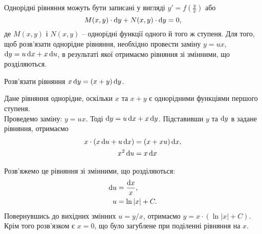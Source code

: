 Однорідні рівняння можуть бути записані у вигляді $y' = f \left( \frac{y}{x} \right)$ або 
\begin{equation*}
 	M(x, y)\cdot\mathop{}\!\mathrm{d} y + N(x, y) \cdot \mathop{}\!\mathrm{d} y = 0,
\end{equation*} де $M(x, y)$ і $N(x, y)$ -- однорідні функції одного й того ж ступеня. Для того, щоб розв’язати однорідне рівняння, необхідно провести заміну $y = u x$, $\mathop{}\!\mathrm{d} y = u \mathop{}\!\mathrm{d} x + x \mathop{}\!\mathrm{d} u$, в результаті якої отримаємо рівняння зі змінними, що розділяються. 

\begin{example}
	Розв’язати рівняння $x \mathop{}\!\mathrm{d} y = (x + y) \mathop{}\!\mathrm{d} y$. 
\end{example}

\begin{solution}
	Дане рівняння однорідне, оскільки $x$ та $x + y$ є однорідними функціями першого ступеня. \\

	Проведемо заміну: $y = u x$. Тоді $\mathop{}\!\mathrm{d} y = u \mathop{}\!\mathrm{d} x + x \mathop{}\!\mathrm{d} y$. Підставивши $y$ та $\mathop{}\!\mathrm{d} y$ в задане рівняння, отримаємо  
	\begin{align}
		\label{eq:1.2.22}
		x \cdot (x \mathop{}\!\mathrm{d} u + u \mathop{}\!\mathrm{d} x) &= (x + x u) \mathop{}\!\mathrm{d} x, \\
		x^2 \mathop{}\!\mathrm{d} u &= x \mathop{}\!\mathrm{d} x
	\end{align}

	Розв’яжемо це рівняння зі змінними, що розділяються:
	\begin{align}
		\label{eq:1.2.23}
		\mathop{}\!\mathrm{d} u &= \frac{\mathop{}\!\mathrm{d} x}{x}, \\
		u &= \ln |x| + C.
	\end{align}
	Повернувшись до вихідних змінних $u = y / x$, отримаємо $y = x \cdot (\ln |x| + C)$. Крім того розв’язком є $x = 0$, що було загублене при поділенні рівняння на $x$.
\end{solution}

